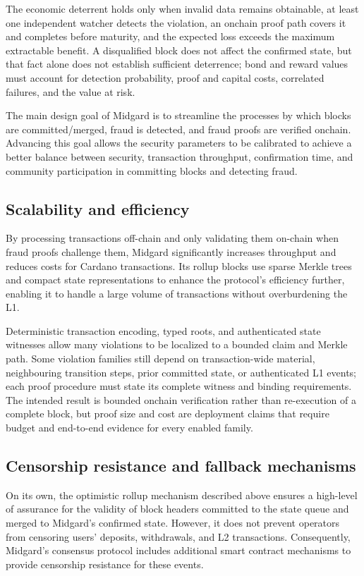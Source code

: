 \documentclass[../midgard.tex]{subfiles}
\begin{document}
The economic deterrent holds only when invalid data remains obtainable, at least one independent watcher detects the violation, an onchain proof path covers it and completes before maturity, and the expected loss exceeds the maximum extractable benefit.
A disqualified block does not affect the confirmed state, but that fact alone does not establish sufficient deterrence; bond and reward values must account for detection probability, proof and capital costs, correlated failures, and the value at risk.

The main design goal of Midgard is to streamline the processes by which blocks are committed/merged, fraud is detected, and fraud proofs are verified onchain.
Advancing this goal allows the security parameters to be calibrated to achieve a better balance between security, transaction throughput, confirmation time, and community participation in committing blocks and detecting fraud.

\subsection*{Scalability and efficiency}
\label{h:scalability-and-efficiency}

By processing transactions off-chain and only validating them on-chain when fraud proofs challenge them, Midgard significantly increases throughput and reduces costs for Cardano transactions.
Its rollup blocks use sparse Merkle trees and compact state representations to enhance the protocol's efficiency further, enabling it to handle a large volume of transactions without overburdening the L1.

Deterministic transaction encoding, typed roots, and authenticated state witnesses allow many violations to be localized to a bounded claim and Merkle path.
Some violation families still depend on transaction-wide material, neighbouring transition steps, prior committed state, or authenticated L1 events; each proof procedure must state its complete witness and binding requirements.
The intended result is bounded onchain verification rather than re-execution of a complete block, but proof size and cost are deployment claims that require budget and end-to-end evidence for every enabled family.

\subsection*{Censorship resistance and fallback mechanisms}

On its own, the optimistic rollup mechanism described above ensures a high-level of assurance for the validity of block headers committed to the state queue and merged to Midgard's confirmed state.
However, it does not prevent operators from censoring users' deposits, withdrawals, and L2 transactions.
Consequently, Midgard's consensus protocol includes additional smart contract mechanisms to provide censorship resistance for these events.
\end{document}
